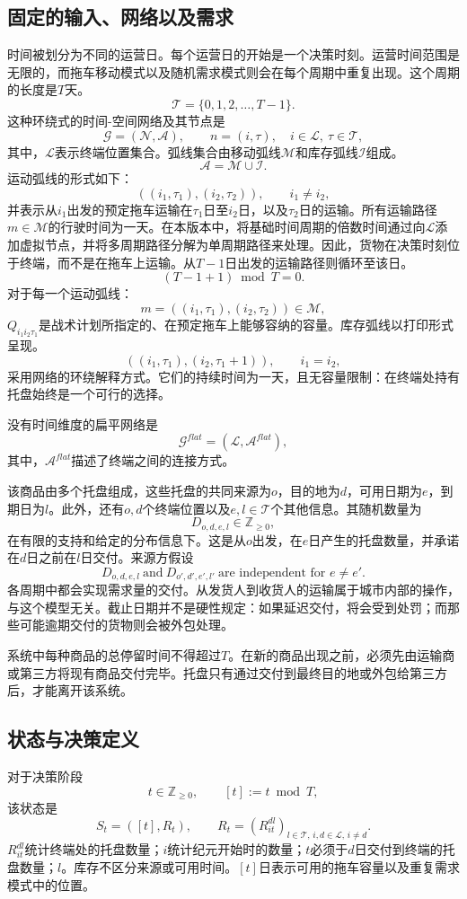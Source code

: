 \documentclass{article}
\begin{document}
\subsection*{固定的输入、网络以及需求}
时间被划分为不同的运营日。每个运营日的开始是一个决策时刻。运营时间范围是无限的，而拖车移动模式以及随机需求模式则会在每个周期中重复出现。这个周期的长度是$T$天。
\[
\mathcal{T}=\{0,1,2,\ldots,T-1\}.
\]
这种环绕式的时间-空间网络及其节点是
\[
\mathcal{G}=(\mathcal{N},\mathcal{A}),\qquad
n=(i,\tau),\quad i\in\mathcal{L},\ \tau\in\mathcal{T},
\]
其中，$\mathcal{L}$表示终端位置集合。弧线集合由移动弧线$\mathcal{M}$和库存弧线$\mathcal{I}$组成。
\[
\mathcal{A}=\mathcal{M}\cup\mathcal{I}.
\]
运动弧线的形式如下：
\[
((i_1,\tau_1),(i_2,\tau_2)),\qquad i_1\ne i_2,
\]
并表示从$i_1$出发的预定拖车运输在$\tau_1$日至$i_2$日，以及$\tau_2$日的运输。所有运输路径$m\in\mathcal{M}$的行驶时间为一天。在本版本中，将基础时间周期的倍数时间通过向$\mathcal{L}$添加虚拟节点，并将多周期路径分解为单周期路径来处理。因此，货物在决策时刻位于终端，而不是在拖车上运输。从$T-1$日出发的运输路径则循环至该日。
\[
(T-1+1)\bmod T=0.
\]
对于每一个运动弧线：
\[
m=((i_1,\tau_1),(i_2,\tau_2))\in\mathcal{M},
\]
$Q_{i_1i_2\tau_1}$是战术计划所指定的、在预定拖车上能够容纳的容量。库存弧线以打印形式呈现。
\[
((i_1,\tau_1),(i_2,\tau_1+1)),\qquad i_1=i_2,
\]
采用网络的环绕解释方式。它们的持续时间为一天，且无容量限制：在终端处持有托盘始终是一个可行的选择。

没有时间维度的扁平网络是
\[
\mathcal{G}^{flat}=(\mathcal{L},\mathcal{A}^{flat}),
\]
其中，$\mathcal{A}^{flat}$描述了终端之间的连接方式。

该商品由多个托盘组成，这些托盘的共同来源为$o$，目的地为$d$，可用日期为$e$，到期日为$l$。此外，还有$o,d$个终端位置以及$e,l\in\mathcal{T}$个其他信息。其随机数量为
\[
D_{o,d,e,l}\in\mathbb{Z}_{\geq0},
\]
在有限的支持和给定的分布信息下。这是从$o$出发，在$e$日产生的托盘数量，并承诺在$d$日之前在$l$日交付。来源方假设
\[
D_{o,d,e,l}\ \text{and}\ D_{o',d',e',l'}
\ \text{are independent for }e\ne e'.
\]
各周期中都会实现需求量的交付。从发货人到收货人的运输属于城市内部的操作，与这个模型无关。截止日期并不是硬性规定：如果延迟交付，将会受到处罚；而那些可能逾期交付的货物则会被外包处理。

系统中每种商品的总停留时间不得超过$T$。在新的商品出现之前，必须先由运输商或第三方将现有商品交付完毕。托盘只有通过交付到最终目的地或外包给第三方后，才能离开该系统。

\subsection*{状态与决策定义}
对于决策阶段
\[
t\in\mathbb{Z}_{\geq0},\qquad [t]:=t\bmod T,
\]
该状态是
\[
S_t=([t],R_t),\qquad
R_t=(R_{it}^{dl})_{l\in\mathcal{T},\,i,d\in\mathcal{L},\,i\ne d}.
\]
$R_{it}^{dl}$统计终端处的托盘数量；$i$统计纪元开始时的数量；$t$必须于$d$日交付到终端的托盘数量；$l$。库存不区分来源或可用时间。$[t]$日表示可用的拖车容量以及重复需求模式中的位置。
\end{document}
